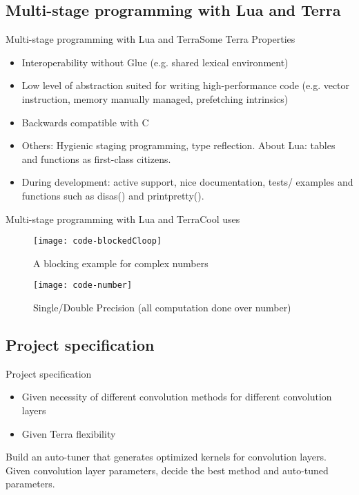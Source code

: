 \documentclass{beamer}
\begin{document}
\subsection{Multi-stage programming with Lua and Terra}

\begin{frame}{Multi-stage programming with Lua and Terra}{Some Terra Properties}
  \begin{itemize}
  
  \item {
    Interoperability without Glue (e.g. shared lexical environment)
  }
    
   \item {   
    Low level of abstraction suited
for writing high-performance code (e.g. vector instruction, memory manually managed, prefetching intrinsics)
  }

  \item {   
    Backwards compatible with C
  }

  \item {   
    Others: Hygienic staging programming, type reflection. About Lua: tables and functions as first-class citizens. 
  }
 
  \item {   
    During development: active support, nice documentation, tests/ examples and functions such as disas() and printpretty().
  }
  \end{itemize}
\end{frame}

\begin{frame}{Multi-stage programming with Lua and Terra}{Cool uses}
 \begin{figure}[ht] \label{fig1} 
\texttt{[image: code-blockedCloop]}
 \caption{A blocking example for complex numbers} 
\texttt{[image: code-number]}
 \caption{Single/Double Precision (all computation done over number)} 
\end{figure}
\end{frame}

\subsection{Project specification}

\begin{frame}{Project specification}
\begin{itemize}
  \item {
    Given necessity of different convolution methods for different convolution layers
  }
   \item {   
    Given Terra flexibility
  }
\end{itemize}

\begin{block}{}
 Build an auto-tuner that generates optimized kernels for convolution layers. Given convolution layer parameters, decide the best method and auto-tuned parameters.
\end{block}

\end{frame}
\end{document}
